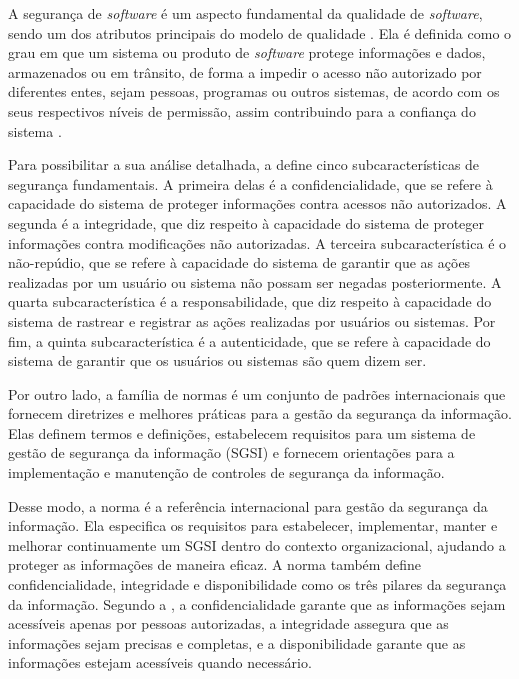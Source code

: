 A segurança de \textit{software} é um aspecto fundamental da qualidade de \textit{software}, sendo um dos atributos principais do modelo de qualidade . 
Ela é definida como o grau em que um sistema ou produto de \textit{software} protege informações e dados, armazenados ou em trânsito, de forma a impedir o acesso não autorizado por diferentes entes, sejam pessoas, programas ou outros sistemas, de acordo
com os seus respectivos níveis de permissão, assim contribuindo para a confiança do sistema \cite{ISOIEC25010}. 

Para possibilitar a sua análise detalhada, a  define cinco subcaracterísticas de segurança fundamentais. A primeira delas é a confidencialidade, que se refere à capacidade do sistema de proteger informações contra acessos não autorizados. 
A segunda é a integridade, que diz respeito à capacidade do sistema de proteger informações contra modificações não autorizadas. A terceira subcaracterística é o não-repúdio, que se refere à capacidade do sistema de garantir que as ações realizadas por um usuário ou sistema não possam ser negadas posteriormente. 
A quarta subcaracterística é a responsabilidade, que diz respeito à capacidade do sistema de rastrear e registrar as ações realizadas por usuários ou sistemas. Por fim, a quinta subcaracterística é a autenticidade, que se refere à capacidade do sistema de garantir que os usuários ou sistemas são quem dizem ser.

Por outro lado, a família de normas  é um conjunto de padrões internacionais que fornecem diretrizes e melhores práticas para a gestão da segurança da informação. Elas definem termos e definições, estabelecem requisitos para um sistema de gestão de segurança da informação (SGSI) e fornecem orientações para a implementação e manutenção de controles de segurança da informação.

Desse modo, a norma  é a referência internacional para gestão da segurança da informação. Ela especifica os requisitos para estabelecer, implementar, manter e melhorar continuamente um SGSI dentro do contexto organizacional, ajudando a proteger as informações de maneira eficaz. 
A norma também define confidencialidade, integridade e disponibilidade como os três pilares da segurança da informação. Segundo a , a confidencialidade garante que as informações sejam acessíveis apenas por pessoas autorizadas, a integridade assegura que as informações sejam precisas e completas, e a disponibilidade garante que as informações estejam acessíveis quando necessário.


